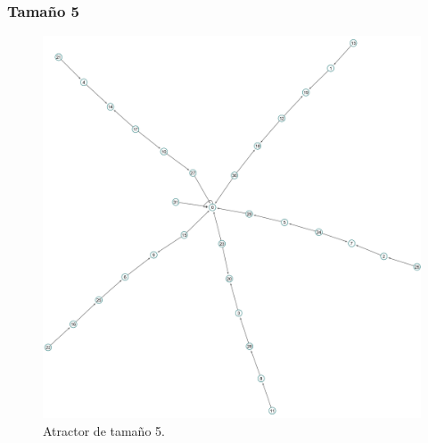 \documentclass[11pt]{article}
\begin{document}
			\subsubsection{Tamaño 5}
			\begin{figure}[H]
			\centering
			\includegraphics[scale=0.1]{resources/Atractores22/atractor_22_size_5.png}
			\caption{Atractor de tamaño 5.}\label{fig:picture}
			\end{figure}
\end{document}
